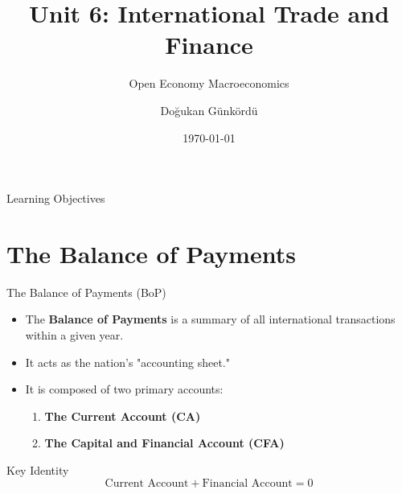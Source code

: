 \documentclass[aspectratio=169]{beamer}
\title{Unit 6: International Trade and Finance}
\subtitle{Open Economy Macroeconomics}
\author{Doğukan Günkördü}
\institute{High School Economics}
\date{\today}
\begin{document}
\begin{frame}
    \titlepage
\end{frame}

\begin{frame}{Learning Objectives}
    \tableofcontents
\end{frame}

\section{The Balance of Payments}

\begin{frame}{The Balance of Payments (BoP)}
    \begin{itemize}
        \item The \textbf{Balance of Payments} is a summary of all international transactions within a given year.
        \item It acts as the nation's "accounting sheet."
        \item It is composed of two primary accounts:
        \begin{enumerate}
            \item \textbf{The Current Account (CA)}
            \item \textbf{The Capital and Financial Account (CFA)}
        \end{enumerate}
    \end{itemize}
    \begin{alertblock}{Key Identity}
        \[ \text{Current Account} + \text{Financial Account} = 0 \]
    \end{alertblock}
\end{frame}
\end{document}
